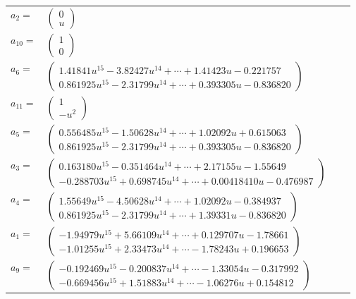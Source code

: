 \documentclass[1p]{elsarticle_modified}
\theoremstyle{definition}
\begin{document}
\begin{tabular}{m{7pt} m{180pt} m{7pt} m{180pt} }
\flushright $a_{2}=$&$\begin{pmatrix}0\\u\end{pmatrix}$ \\
\flushright $a_{10}=$&$\begin{pmatrix}1\\0\end{pmatrix}$ \\
\flushright $a_{6}=$&$\begin{pmatrix}1.41841 u^{15}-3.82427 u^{14}+\cdots+1.41423 u-0.221757\\0.861925 u^{15}-2.31799 u^{14}+\cdots+0.393305 u-0.836820\end{pmatrix}$ \\
\flushright $a_{11}=$&$\begin{pmatrix}1\\- u^2\end{pmatrix}$ \\
\flushright $a_{5}=$&$\begin{pmatrix}0.556485 u^{15}-1.50628 u^{14}+\cdots+1.02092 u+0.615063\\0.861925 u^{15}-2.31799 u^{14}+\cdots+0.393305 u-0.836820\end{pmatrix}$ \\
\flushright $a_{3}=$&$\begin{pmatrix}0.163180 u^{15}-0.351464 u^{14}+\cdots+2.17155 u-1.55649\\-0.288703 u^{15}+0.698745 u^{14}+\cdots+0.00418410 u-0.476987\end{pmatrix}$ \\
\flushright $a_{4}=$&$\begin{pmatrix}1.55649 u^{15}-4.50628 u^{14}+\cdots+1.02092 u-0.384937\\0.861925 u^{15}-2.31799 u^{14}+\cdots+1.39331 u-0.836820\end{pmatrix}$ \\
\flushright $a_{1}=$&$\begin{pmatrix}-1.94979 u^{15}+5.66109 u^{14}+\cdots+0.129707 u-1.78661\\-1.01255 u^{15}+2.33473 u^{14}+\cdots-1.78243 u+0.196653\end{pmatrix}$ \\
\flushright $a_{9}=$&$\begin{pmatrix}-0.192469 u^{15}-0.200837 u^{14}+\cdots-1.33054 u-0.317992\\-0.669456 u^{15}+1.51883 u^{14}+\cdots-1.06276 u+0.154812\end{pmatrix}$ \\

\end{tabular}
\end{document}
